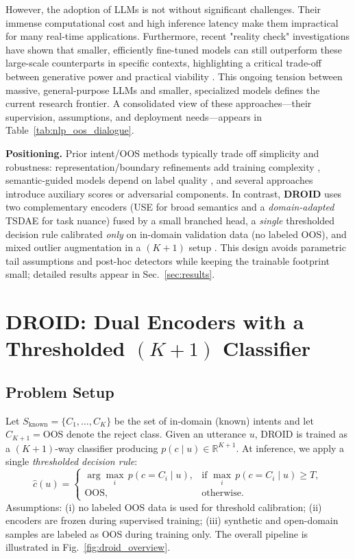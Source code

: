 \documentclass[journal,letterpaper]{IEEEtran}
\begin{document}
However, the adoption of LLMs is not without significant challenges. Their immense computational cost and high inference latency make them impractical for many real-time applications. Furthermore, recent "reality check" investigations have shown that smaller, efficiently fine-tuned models can still outperform these large-scale counterparts in specific contexts, highlighting a critical trade-off between generative power and practical viability \cite{arora-varma-2024-intent}. This ongoing tension between massive, general-purpose LLMs and smaller, specialized models defines the current research frontier. A consolidated view of these approaches—their supervision, assumptions, and deployment needs—appears in Table~\ref{tab:nlp_oos_dialogue}.


\noindent\textbf{Positioning.}
Prior intent/OOS methods typically trade off simplicity and robustness: representation/boundary refinements add training complexity \cite{chen2024tcab,zhang2024finetuning}, semantic-guided models depend on label quality \cite{gautam2024scoos}, and several approaches introduce auxiliary scores or adversarial components. In contrast, \textbf{DROID} uses two complementary encoders (USE for broad semantics and a \emph{domain-adapted} TSDAE for task nuance) fused by a small branched head, a \emph{single} thresholded decision rule calibrated \emph{only} on in-domain validation data (no labeled OOS), and mixed outlier augmentation in a $(K{+}1)$ setup \cite{Zhan_2021}. This design avoids parametric tail assumptions and post-hoc detectors while keeping the trainable footprint small; detailed results appear in Sec.~\ref{sec:results}.


\section{DROID: Dual Encoders with a Thresholded $(K{+}1)$ Classifier}
\label{sec:droid}

\subsection{Problem Setup}
Let $S_{\text{known}}=\{C_1,\ldots, C_K\}$ be the set of in-domain (known) intents and let $C_{K+1}=\text{OOS}$ denote the reject class. Given an utterance $u$, DROID is trained as a $(K{+}1)$-way classifier producing $p(c\mid u)\in\mathbb{R}^{K+1}$. At inference, we apply a single \emph{thresholded decision rule}:
\begin{equation}
\label{eq:decision}
\hat{c}(u)=
\begin{cases}
\arg\max_i\, p(c{=}C_i\mid u), & \text{if } \max_i\, p(c{=}C_i\mid u)\ge T,\\[2pt]
\text{OOS}, & \text{otherwise}.
\end{cases}
\end{equation}
Assumptions: (i) no labeled OOS data is used for threshold calibration; (ii) encoders are frozen during supervised training; (iii) synthetic and open-domain samples are labeled as OOS during training only. The overall pipeline is illustrated in Fig.~\ref{fig:droid_overview}.
\end{document}

